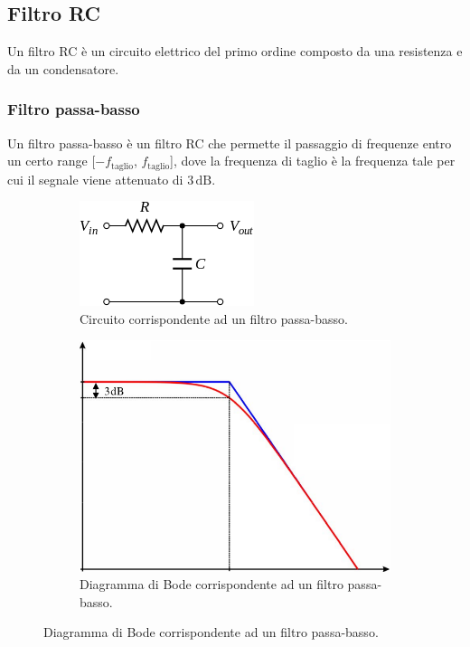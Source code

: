 \documentclass{article}
\begin{document}
		\subsection{Filtro RC}
			Un filtro RC è un circuito elettrico del primo ordine composto da una resistenza e da un condensatore.
			\subsubsection{Filtro passa-basso}
				Un filtro passa-basso è un filtro RC che permette il passaggio di frequenze entro un certo range [$ -f_{\mathrm{taglio}} $, $ f_{\mathrm{taglio}} $], dove la frequenza di taglio è la frequenza tale per cui il segnale viene attenuato di $ 3 \, \mathrm{dB} $.
				\begin{figure}[h!]
					\centering
					\begin{subfigure}{0.4\textwidth}
						\centering
						\includegraphics[scale=0.6]{filtroPassaBasso}
						\caption{Circuito corrispondente ad un filtro passa-basso.}
					\end{subfigure}
					\begin{subfigure}{0.4\textwidth}
						\centering
						\includegraphics[scale=0.4]{filtroPassaBassoBode}
						\caption{Diagramma di Bode corrispondente ad un filtro passa-basso.}
					\end{subfigure}
					\label{fig:filtroPassaBasso}
				\end{figure}
\end{document}
